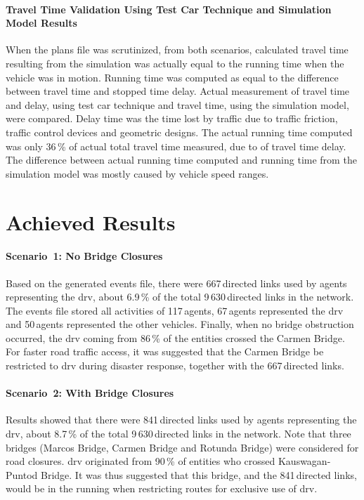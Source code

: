 \paragraph{Travel Time Validation Using Test Car Technique and Simulation Model Results}
When the plans file was scrutinized, from both scenarios, calculated travel time resulting from the simulation was actually equal to the running time when the vehicle was in motion. Running time was computed as equal to the difference between travel time and stopped time delay. Actual measurement of travel time and delay, using test car technique \citep[][]{Sigua_2008} and travel time, using the simulation model, were compared. Delay time was the time lost by traffic due to traffic friction, traffic control devices and geometric designs. The actual running time computed was only 36\,\% of actual total travel time measured, due to of travel time delay. The difference between actual running time computed and running time from the simulation model was mostly caused by vehicle speed ranges. 

\section{Achieved Results}
\paragraph{Scenario~1: No Bridge Closures}
Based on the generated events file, there were 667\,directed links used by agents representing the \gls{drv}, about 6.9\,\% of the total 9\,630\,directed links in the network. The events file stored all activities of 117\,agents, 67\,agents represented the \gls{drv} and 50\,agents represented the other vehicles. Finally, when no bridge obstruction occurred, the \gls{drv} coming from 86\,\% of the entities crossed the Carmen Bridge. For faster road traffic access, it was suggested that the Carmen Bridge be restricted to \gls{drv} during disaster response, together with the 667\,directed links.

\paragraph{Scenario~2: With Bridge Closures}
Results showed that there were 841\,directed links used by agents representing the \gls{drv}, about 8.7\,\% of the total 9\,630\,directed links in the network. Note that three bridges (\ie Marcos Bridge, Carmen Bridge and Rotunda Bridge) were considered for road closures. \gls{drv} originated from 90\,\% of entities who crossed  Kauswagan-Puntod Bridge. It was thus suggested that this bridge, and the 841\,directed links, would be in the running when restricting routes for exclusive use of \gls{drv}.

